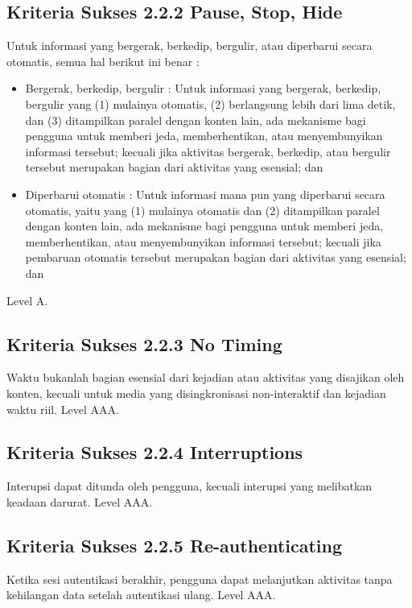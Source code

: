 \subsection{Kriteria Sukses 2.2.2 Pause, Stop, Hide}
\label{sec:kriteria_2.2.2}
Untuk informasi yang bergerak, berkedip, bergulir, atau diperbarui secara otomatis, semua hal berikut ini benar :

\begin{itemize}
	\item Bergerak, berkedip, bergulir : Untuk informasi yang bergerak, berkedip, bergulir yang (1) mulainya otomatis, (2) berlangsung lebih dari lima detik, dan (3) ditampilkan paralel dengan konten lain, ada mekanisme bagi pengguna untuk memberi jeda, memberhentikan, atau menyembunyikan informasi tersebut; kecuali jika aktivitas bergerak, berkedip, atau bergulir tersebut merupakan bagian dari aktivitas yang esensial; dan
	\item Diperbarui otomatis : Untuk informasi mana pun yang diperbarui secara otomatis, yaitu yang (1) mulainya otomatis dan (2) ditampilkan paralel dengan konten lain, ada mekanisme bagi pengguna untuk memberi jeda, memberhentikan, atau menyembunyikan informasi tersebut; kecuali jika pembaruan otomatis tersebut merupakan bagian dari aktivitas yang esensial; dan
\end{itemize}

Level A.

\subsection{Kriteria Sukses 2.2.3 No Timing}
\label{sec:kriteria_2.2.3}
Waktu bukanlah bagian esensial dari kejadian atau aktivitas yang disajikan oleh konten, kecuali untuk media yang disingkronisasi non-interaktif dan kejadian waktu riil.
Level AAA.

\subsection{Kriteria Sukses 2.2.4 Interruptions}
\label{sec:kriteria_2.2.4}
Interupsi dapat ditunda oleh pengguna, kecuali interupsi yang melibatkan keadaan darurat.
Level AAA.

\subsection{Kriteria Sukses 2.2.5 Re-authenticating}
\label{sec:kriteria_2.2.5}
Ketika sesi autentikasi berakhir, pengguna dapat melanjutkan aktivitas tanpa kehilangan data setelah autentikasi ulang.
Level AAA.

